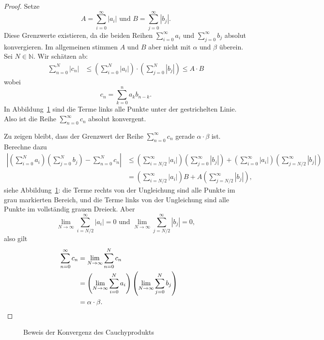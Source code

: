 \documentclass[../main.tex]{subfiles}
\begin{document}
\begin{proof}
  Setze
  \[
    A = \sum_{i=0}^{\infty} |a_i| \text{ und }
    B = \sum_{j=0}^{\infty} |b_j|.
  \]
  Diese Grenzwerte existieren, da die beiden Reihen
  $\sum_{i=0}^{\infty} a_i$ und $\sum_{j=0}^{\infty} b_j$ 
  absolut konvergieren. Im allgemeinen stimmen $A$ und $B$
  aber nicht mit $\alpha$ und $\beta$ überein.
  Sei $N \in \mathbb{N}$. Wir schätzen ab:
  \begin{align*}
    \sum_{n=0}^{N} |c_n| &
    \leq \left(\sum_{i=0}^{N} |a_i|\right)
    \cdot \left( \sum_{j=0}^{N} |b_j| \right) \leq A \cdot B
  \end{align*}
  wobei
  \[
    c_n = \sum_{k=0}^{n} a_k b_{n-k}.
  \]
  In Abbildung~\ref{fig:cauchy-proof}
  sind die Terme links alle
  Punkte unter der
  gestrichelten Linie.
  Also ist die Reihe $\sum_{n=0}^{\infty} c_n$ absolut
  konvergent.

  Zu zeigen bleibt, dass der Grenzwert der Reihe
  $\sum_{n=0}^{\infty} c_n$ gerade $\alpha \cdot \beta$ 
  ist. Berechne dazu
  \begin{align*}
    \left| \left( \sum_{i=0}^{N} a_i \right)
    \left( \sum_{j=0}^{N} b_j \right) - \sum_{n=0}^{N} c_n \right| 
    & \leq \left(\sum_{i=N/2}^{\infty} |a_i| \right)
     \left( \sum_{j=0}^{\infty} |b_j| \right)
     + \left( \sum_{i=0}^{\infty} |a_i| \right)
     \left( \sum_{j=N/2}^{\infty} |b_j| \right)\\
    &= \left( \sum_{i=N/2}^{\infty} |a_i| \right) B
    + A \left( \sum_{j=N/2}^{\infty} |b_j| \right),
  \end{align*}
  siehe Abbildung~\ref{fig:cauchy-proof}: die
  Terme rechts von der Ungleichung sind alle Punkte
  im grau markierten Bereich,
  und die Terme links von der Ungleichung
  sind alle Punkte im vollständig grauen Dreieck.
  Aber
  \[
    \lim_{N \to \infty} \sum_{i=N/2}^{\infty} |a_i| = 0
    \text{ und }
    \lim_{N \to \infty} \sum_{j=N/2}^{\infty} |b_j| = 0,
  \]
  also gilt
  \begin{align*}
    \sum_{n=0}^{\infty} c_n 
    & = \lim_{N \to \infty} \sum_{n=0}^{N} c_n \\
    & = \left( \lim_{N \to \infty}\sum_{i=0}^{N} a_i \right)
    \left( \lim_{N \to \infty}\sum_{j=0}^{N} b_j \right) \\
    & = \alpha \cdot \beta. && \qedhere
  \end{align*}
\end{proof}


\begin{figure}[htb]
  \centering
  
  \caption{Beweis der Konvergenz des Cauchyprodukts}%
  \label{fig:cauchy-proof}
\end{figure}
\end{document}
